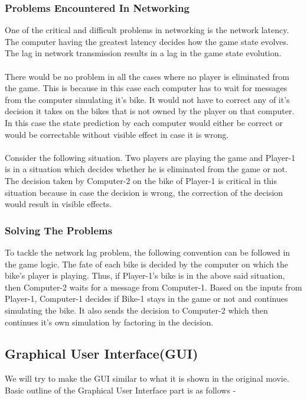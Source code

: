 \documentclass[14 pt]{article}
\begin{document}
\subsubsection{Problems Encountered In Networking}
    One of the critical and difficult problems in networking is the network latency. The computer having the greatest latency decides how the game state evolves. The lag in network transmission results in a lag in the game state evolution.\\\\
    There would be no problem in all the cases where no player is eliminated from the game. This is because in this case each computer has to wait for messages from the computer simulating it's bike. It would not have to correct any of it's decision it takes on the bikes that is not owned by the player on that computer. In this case the state prediction by each computer would either be correct or would be correctable without visible effect in case it is wrong.\\\\
    Consider the following situation. Two players are playing the game and Player-1 is in a situation which decides whether he is eliminated from the game or not. The decision taken by Computer-2 on the bike of Player-1 is critical in this situation because in case the decision is wrong, the correction of the decision would result in visible effects.\\

\subsubsection{Solving The Problems}
    To tackle the network lag problem, the following convention can be followed in the game logic. The fate of each bike is decided by the computer on which the bike's player is playing. Thus, if Player-1's bike is in the above said situation, then Computer-2 waits for a message from Computer-1. Based on the inputs from Player-1, Computer-1 decides if Bike-1 stays in the game or not and continues simulating the bike. It also sends the decision to Computer-2 which then continues it's own simulation by factoring in the decision.\\


\subsection{Graphical User Interface(GUI)}
    We will try to make the GUI similar to what it is shown in the original movie. Basic outline of the Graphical User Interface part is as follows -\\
\end{document}
